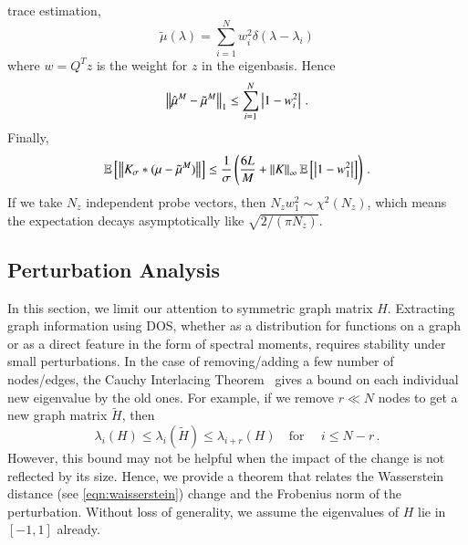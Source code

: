 trace estimation,
\begin{equation}
	\tilde{\mu}(\lambda) = \sum_{i=1}^Nw_i^2\delta(\lambda-\lambda_i)
\end{equation}
where $w=Q^Tz$ is the weight for $z$ in the eigenbasis. Hence
\begin{equation}
	\left\lVert\hat{\mu}^M-\tilde{\mu}^M\right\rVert_1 \leq \sum_{i=1}^N \left\lvert1-w_i^2\right\rvert\,.
\end{equation}
Finally,
\begin{equation}
	\operatorname{\mathbb{E}}\left[\left\lVert K_\sigma\ast(\mu-\tilde{\mu}^M)\right\rVert\right]\leq \frac{1}
	{\sigma}\left(\frac{6L}{M}+\left\lVert K\right\rVert_\infty\operatorname{\mathbb{E}}\left[
	\left\lvert1-w_1^2\right\rvert\right]\right)\,.
\end{equation}
If we take $N_z$ independent probe vectors, then $N_zw_1^2\sim\chi^2(N_z)$,
which means the expectation decays asymptotically like $\sqrt{2 / (\pi N_z)}$.

\subsection{Perturbation Analysis}
In this section, we limit our attention to symmetric graph matrix $H$.
Extracting graph information using DOS, whether as a distribution for functions
on a graph or as a direct feature in the form of spectral moments, requires
stability under small perturbations. In the case of removing/adding a few 
number of nodes/edges, the Cauchy Interlacing Theorem~\cite{magnus1988matrix}
gives a bound on each individual new eigenvalue by the old ones. For example, 
if we remove $r\ll N$ nodes to get a new graph matrix $
\widetilde{H}$, then
\begin{equation}\label{eqn:interlacing}
	\lambda_i(H)\leq \lambda_i(\widetilde{H})\leq \lambda_{i+r}(H)\quad\text{for
	}\quad i\leq N-r\,.
\end{equation}
However, this bound may not be helpful when the impact of the change is not
reflected by its size. Hence, we provide a theorem that relates the Wasserstein
distance (see \cref{eqn:waisserstein}) change and the Frobenius norm of
the perturbation. Without loss of generality, we assume the eigenvalues of $H$
lie in $[-1,1]$ already.

